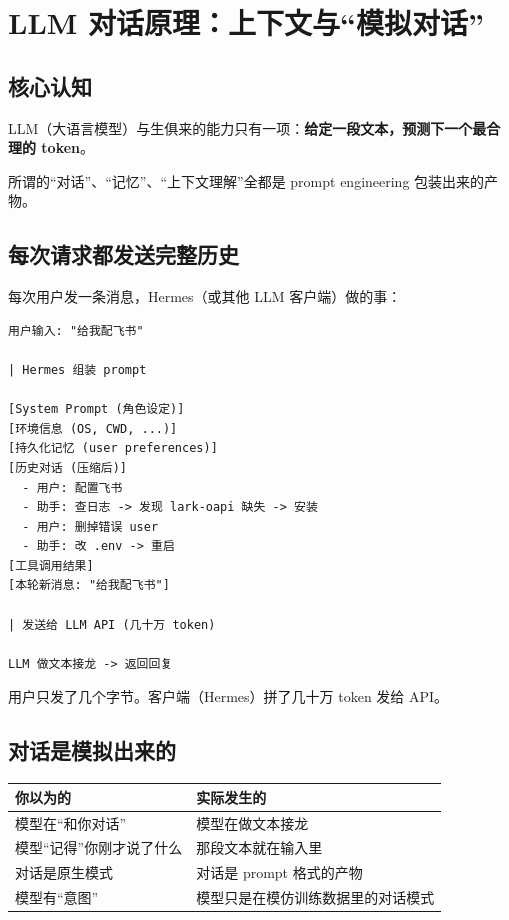 \section{LLM 对话原理：上下文与``模拟对话''}
\label{sec:llm-dialogue}

\subsection{核心认知}

LLM（大语言模型）与生俱来的能力只有一项：\textbf{给定一段文本，预测下一个最合理的 token}。

所谓的``对话''、``记忆''、``上下文理解''全都是 prompt engineering 包装出来的产物。

\subsection{每次请求都发送完整历史}

每次用户发一条消息，Hermes（或其他 LLM 客户端）做的事：

\begin{lstlisting}
用户输入: "给我配飞书"

| Hermes 组装 prompt

[System Prompt (角色设定)]
[环境信息 (OS, CWD, ...)]
[持久化记忆 (user preferences)]
[历史对话 (压缩后)]
  - 用户: 配置飞书
  - 助手: 查日志 -> 发现 lark-oapi 缺失 -> 安装
  - 用户: 删掉错误 user
  - 助手: 改 .env -> 重启
[工具调用结果]
[本轮新消息: "给我配飞书"]

| 发送给 LLM API (几十万 token)

LLM 做文本接龙 -> 返回回复
\end{lstlisting}

用户只发了几个字节。客户端（Hermes）拼了几十万 token 发给 API。

\subsection{对话是模拟出来的}

\begin{longtable}{ll}
\toprule
\textbf{你以为的} & \textbf{实际发生的} \\
\midrule
\endhead
模型在``和你对话'' & 模型在做文本接龙 \\
模型``记得''你刚才说了什么 & 那段文本就在输入里 \\
对话是原生模式 & 对话是 prompt 格式的产物 \\
模型有``意图'' & 模型只是在模仿训练数据里的对话模式 \\
\bottomrule
\end{longtable}

